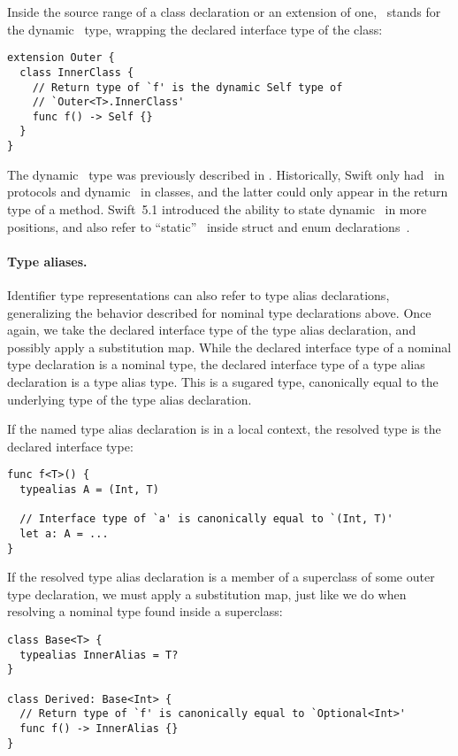 \documentclass[../generics]{subfiles}
\begin{document}
Inside the source range of a class declaration or an extension of one, \tSelf\ stands for the dynamic \tSelf\ type, wrapping the declared interface type of the class:
\begin{Verbatim}
extension Outer {
  class InnerClass {
    // Return type of `f' is the dynamic Self type of
    // `Outer<T>.InnerClass'
    func f() -> Self {}
  }
}
\end{Verbatim}

The dynamic \tSelf\ type was previously described in . Historically, Swift only had \tSelf\ in protocols and dynamic \tSelf\ in classes, and the latter could only appear in the return type of a method. Swift~5.1 introduced the ability to state dynamic \tSelf\ in more positions, and also refer to ``static'' \tSelf\ inside struct and enum declarations~\cite{se0068}.

\paragraph{Type aliases.}
Identifier type representations can also refer to type alias declarations, generalizing the behavior described for nominal type declarations above. Once again, we take the declared interface type of the type alias declaration, and possibly apply a substitution map. While the declared interface type of a nominal type declaration is a nominal type, the declared interface type of a type alias declaration is a type alias type. This is a sugared type, canonically equal to the underlying type of the type alias declaration.

If the named type alias declaration is in a local context, the resolved type is the declared interface type:
\begin{Verbatim}
func f<T>() {
  typealias A = (Int, T)

  // Interface type of `a' is canonically equal to `(Int, T)'
  let a: A = ...
}
\end{Verbatim}

If the resolved type alias declaration is a member of a superclass of some outer type declaration, we must apply a substitution map, just like we do when resolving a nominal type found inside a superclass:
\begin{Verbatim}
class Base<T> {
  typealias InnerAlias = T?
}

class Derived: Base<Int> {
  // Return type of `f' is canonically equal to `Optional<Int>'
  func f() -> InnerAlias {}
}
\end{Verbatim}
\end{document}
